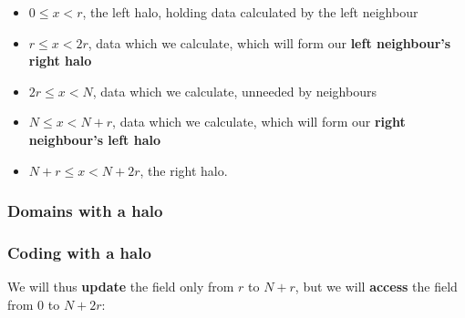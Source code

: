 \begin{itemize}
\itemsep1pt\parskip0pt
\item
  $0 \le x < r$, the left halo, holding data calculated by the left
  neighbour
\item
  $r \le x < 2r$, data which we calculate, which will form our
  \textbf{left neighbour's right halo}
\item
  $2r \le x < N$, data which we calculate, unneeded by neighbours
\item
  $N \le x < N+r$, data which we calculate, which will form our
  \textbf{right neighbour's left halo}
\item
  $N+r \le x < N+2r$, the right halo.
\end{itemize}

\subsubsection{Domains with a halo}\label{domains-with-a-halo-1}

\begin{Shaded}
\begin{Highlighting}[]

       
       
\end{Highlighting}
\end{Shaded}

\subsubsection{Coding with a halo}\label{coding-with-a-halo}

We will thus \textbf{update} the field only from $r$ to $N+r$, but we
will \textbf{access} the field from $0$ to $N+2r$:

\begin{Shaded}
\begin{Highlighting}[]
 \NormalTok{; } 
\end{Highlighting}
\end{Shaded}

